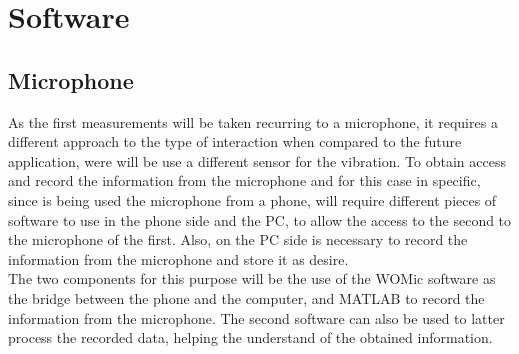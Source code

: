 \cleardoublepage
\chapter{Software}
\section{Microphone}
As the first measurements will be taken recurring to a microphone, it requires a different approach to the type of interaction when compared to the future application, were will be use a different sensor for the vibration. To obtain access and record the information from the microphone and for this case in specific, since is being used the microphone from a phone, will require different pieces of software to use in the phone side and the PC, to allow the access to the second to the microphone of the first. Also, on the PC side is necessary to record the information from the microphone and store it as desire.\\
The two components for this purpose will be the use of the WOMic software as the bridge between the phone and the computer, and MATLAB to record the information from the microphone. The second software can also be used to latter process the recorded data, helping the understand of the obtained information. 

